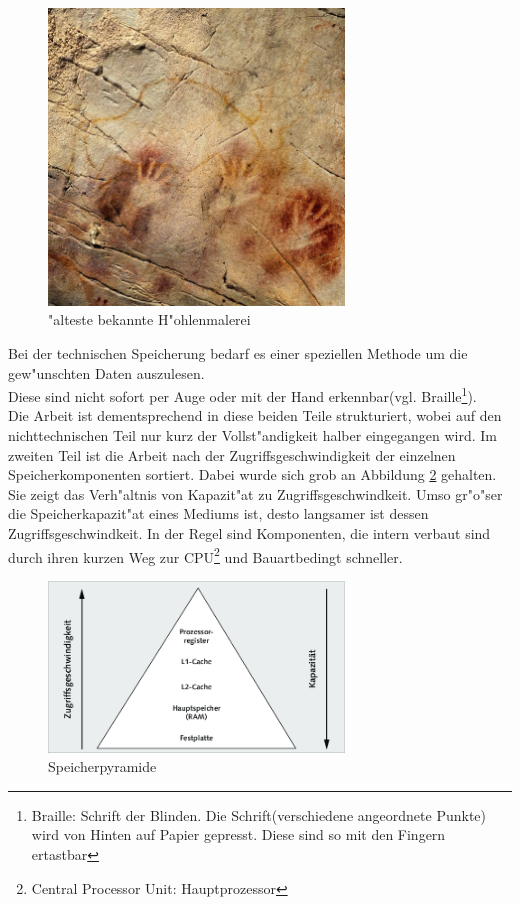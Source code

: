 \begin{figure}[ht]
\centering
\includegraphics[width=0.7\textwidth]{images/hohlenmalerei.jpeg} 
\caption["alteste bekannte H"ohlenmalerei \cite{fig:hohle}]{"alteste bekannte H"ohlenmalerei}
\label{fig:hohlenmalerei}
\end{figure}


Bei der technischen Speicherung bedarf es einer speziellen Methode um die gew"unschten Daten auszulesen. \\Diese sind nicht sofort per Auge oder mit der Hand erkennbar(vgl. Braille\footnote{Braille: Schrift der Blinden. Die Schrift(verschiedene angeordnete Punkte) wird von Hinten auf Papier gepresst. Diese sind so mit den Fingern ertastbar}). 
\\
Die Arbeit ist dementsprechend in diese beiden Teile strukturiert, wobei auf den nichttechnischen Teil nur kurz der Vollst"andigkeit halber eingegangen wird.
Im zweiten Teil ist die Arbeit nach der Zugriffsgeschwindigkeit der einzelnen Speicherkomponenten sortiert. Dabei wurde sich grob an Abbildung \ref{fig:geschPyr} gehalten. Sie zeigt das Verh"altnis von Kapazit"at zu Zugriffsgeschwindkeit. Umso gr"o"ser die Speicherkapazit"at eines Mediums ist, desto langsamer ist dessen Zugriffsgeschwindkeit. In der Regel sind Komponenten, die intern verbaut sind durch ihren kurzen Weg zur CPU\footnote{Central Processor Unit: Hauptprozessor} und Bauartbedingt schneller.
\begin{figure}[ht]
\centering
\includegraphics[width=0.7\textwidth]{images/speicherpyramide} 
\caption[Speicherpyramide \cite{fig:Speicherpyramide}]{\glqq Speicherpyramide\grqq{}}
\label{fig:geschPyr}
\end{figure}

